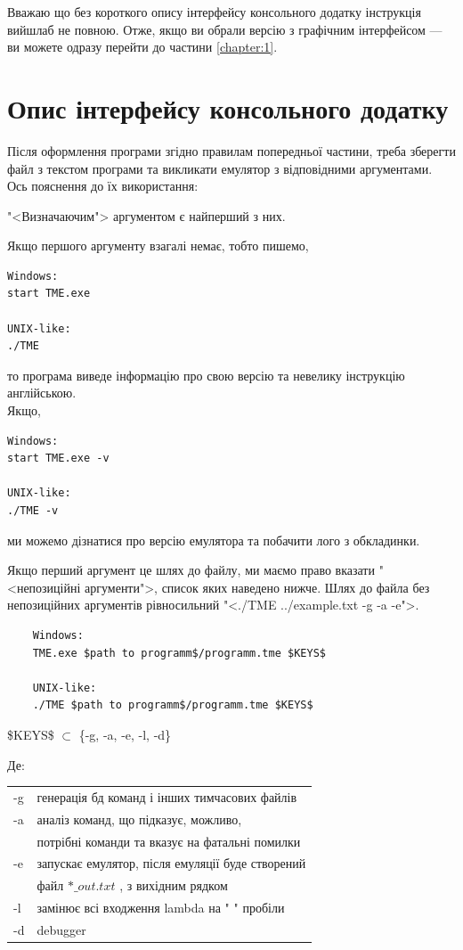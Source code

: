 \documentclass[oneside,final,14pt]{extreport}
\begin{document}
Вважаю що без короткого опису інтерфейсу консольного додатку інструкція вийшлаб не повною. Отже, якщо ви обрали версію з графічним інтерфейсом --- ви можете одразу перейти до частини \ref{chapter:1}.

\section{Опис інтерфейсу консольного додатку}
Після оформлення програми згідно правилам попередньої частини, треба зберегти файл з текстом програми та викликати емулятор з відповідними аргументами. Ось пояснення до їх використання:
\bigskip
		
"<Визначаючим"> аргументом є найперший з них.
		
Якщо першого аргументу взагалі немає, тобто пишемо,
\begin{tcolorbox}
\begin{verbatim}
Windows:
start TME.exe

UNIX-like:
./TME
\end{verbatim}
\end{tcolorbox}
то програма виведе інформацію про свою версію та невелику інструкцію англійською.
\\	
Якщо,
\begin{tcolorbox}
\begin{verbatim}
Windows:
start TME.exe -v

UNIX-like:
./TME -v
\end{verbatim}
\end{tcolorbox}
ми можемо дізнатися про версію емулятора та побачити лого з обкладинки.

Якщо перший аргумент це шлях до файлу, ми маємо право вказати "<непозиційні аргументи">, список яких наведено нижче. Шлях до файла без непозиційних аргументів рівносильний "<./TME ../example.txt -g -a -e">.
		
		
\begin{tcolorbox}	
\begin{verbatim}
	Windows:
	TME.exe $path to programm$/programm.tme $KEYS$

	UNIX-like:
	./TME $path to programm$/programm.tme $KEYS$
\end{verbatim}
\end{tcolorbox}
		

\$KEYS\$ $\subset$ \{-g, -a, -e, -l, -d\}
			
		
		Де:
		
		
\begin{tabular}{ l l }
	-g & генерація бд команд і інших тимчасових файлів \\
	-a & аналіз команд, що підказує, можливо, \\
	   & потрібні команди та вказує на фатальні помилки \\
	-e & запускає емулятор, після емуляції буде створений\\
	   &  файл $*\_out.txt$ , з вихідним рядком \\
	-l & замінює всі входження lambda на " " пробіли\\
	-d & debugger\\ 
\end{tabular}
\end{document}
